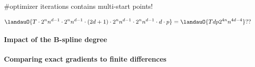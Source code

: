 \#optimizer iterations contains multi-start points!

\begin{equation}
  \landauO{
    T
    \cdot
    2^n n^{d-1}
    \cdot
    2^n n^{d-1}
    \cdot
    (2d + 1)
    \cdot
    2^n n^{d-1}
    \cdot
    2^n n^{d-1}
    \cdot
    d
    \cdot
    p
  }
  = \landauO{Tdp 2^{4n} n^{4d-4}}??
\end{equation}

\dummytext[3]{}

\paragraph{Impact of the B-spline degree}

\dummytext[3]{}

\paragraph{Comparing exact gradients to finite differences}

\dummytext[3]{}
